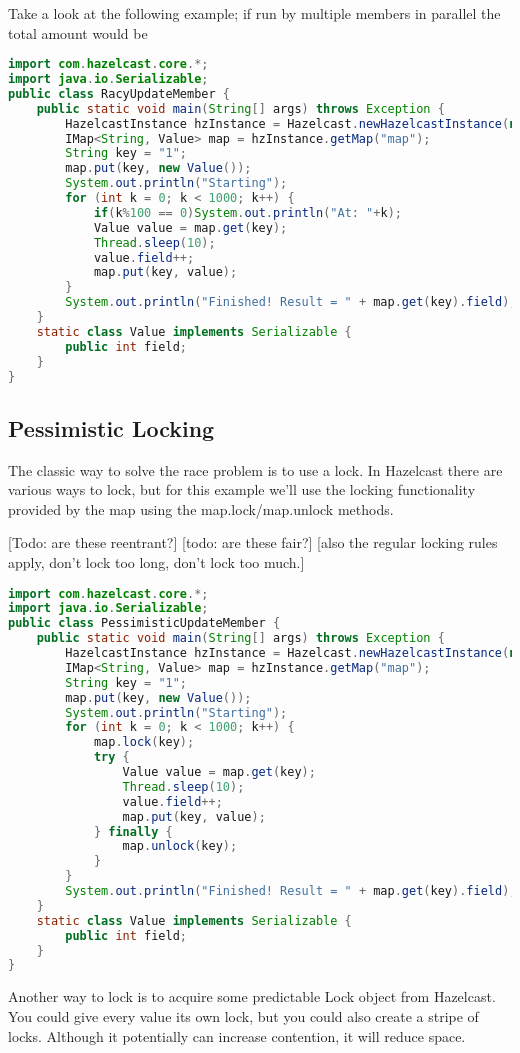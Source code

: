 Take a look at the following example; if run by multiple members in parallel the total amount would be 
\begin{lstlisting}[language=java]
import com.hazelcast.core.*;
import java.io.Serializable;
public class RacyUpdateMember {
    public static void main(String[] args) throws Exception {
        HazelcastInstance hzInstance = Hazelcast.newHazelcastInstance(null);
        IMap<String, Value> map = hzInstance.getMap("map");
        String key = "1";
        map.put(key, new Value());
        System.out.println("Starting");
        for (int k = 0; k < 1000; k++) {
            if(k%100 == 0)System.out.println("At: "+k);
            Value value = map.get(key);
            Thread.sleep(10);
            value.field++;
            map.put(key, value);
        }
        System.out.println("Finished! Result = " + map.get(key).field);
    }
    static class Value implements Serializable {
        public int field;
    }
}
\end{lstlisting}

\subsection{Pessimistic Locking}
The classic way to solve the race problem is to use a lock. In Hazelcast there are various ways to lock, but for this example we'll use the locking functionality provided by the map using the map.lock/map.unlock methods.

[Todo: are these reentrant?]
[todo: are these fair?]
[also the regular locking rules apply, don't lock too long, don't lock too much.]

\begin{lstlisting}[language=java]
import com.hazelcast.core.*;
import java.io.Serializable;
public class PessimisticUpdateMember {
    public static void main(String[] args) throws Exception {
        HazelcastInstance hzInstance = Hazelcast.newHazelcastInstance(null);
        IMap<String, Value> map = hzInstance.getMap("map");
        String key = "1";
        map.put(key, new Value());
        System.out.println("Starting");
        for (int k = 0; k < 1000; k++) {
            map.lock(key);
            try {
                Value value = map.get(key);
                Thread.sleep(10);
                value.field++;
                map.put(key, value);
            } finally {
                map.unlock(key);
            }
        }
        System.out.println("Finished! Result = " + map.get(key).field);
    }
    static class Value implements Serializable {
        public int field;
    }
}
\end{lstlisting}
Another way to lock is to acquire some predictable Lock object from Hazelcast. You could give every value its own lock, but you could also create a stripe of locks. Although it potentially can increase contention, it will reduce space.

